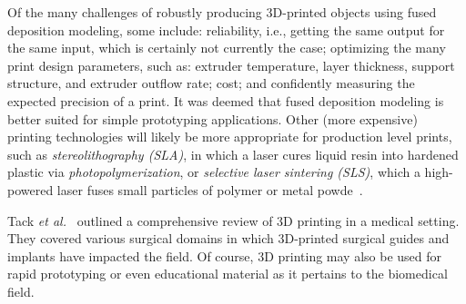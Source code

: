 Of the many challenges of robustly producing 3D-printed objects using fused deposition modeling, some include: reliability, i.e., getting the same output for the same input, which is certainly not currently the case; optimizing the many print design parameters, such as: extruder temperature, layer thickness, support structure, and extruder outflow rate; cost; and confidently measuring the expected precision of a print. It was deemed that fused deposition modeling is better suited for simple prototyping applications. Other (more expensive) printing technologies will likely be more appropriate for production level prints, such as \textit{stereolithography (SLA)}, in which a laser cures liquid resin into hardened plastic via \textit{photopolymerization}, or \textit{selective laser sintering (SLS)}, which a high-powered laser fuses small particles of polymer or metal powde~\cite{3dprints}.

Tack \textit{et al.}~\cite{tack_2016} outlined a comprehensive review of 3D printing in a medical setting. They covered various surgical domains in which 3D-printed surgical guides and implants have impacted the field. Of course, 3D printing may also be used for rapid prototyping or even educational material as it pertains to the biomedical field.